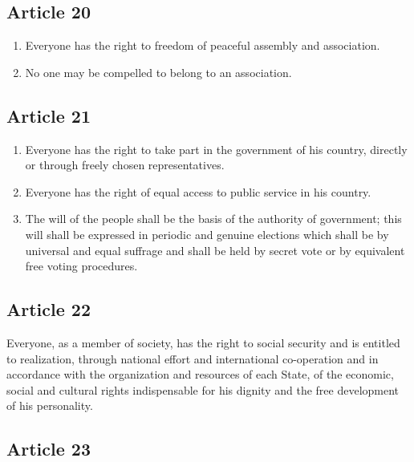 \documentclass[
  ngerman,
  american,
  titlepage,
  openright,
  DIV=calc,
  toc=listof,
  listof=nochaptergap]{scrbook}
\begin{document}
\subsection{Article 20}\label{article-20-4}

\begin{enumerate}
\def\labelenumi{\arabic{enumi}.}
\item
  Everyone has the right to freedom of peaceful assembly and
  association.
\item
  No one may be compelled to belong to an association.
\end{enumerate}

\subsection{Article 21}\label{article-21-4}

\begin{enumerate}
\def\labelenumi{\arabic{enumi}.}
\item
  Everyone has the right to take part in the government of his country,
  directly or through freely chosen representatives.
\item
  Everyone has the right of equal access to public service in his
  country.
\item
  The will of the people shall be the basis of the authority of
  government; this will shall be expressed in periodic and genuine
  elections which shall be by universal and equal suffrage and shall be
  held by secret vote or by equivalent free voting procedures.
\end{enumerate}

\subsection{Article 22}\label{article-22-4}

Everyone, as a member of society, has the right to social security and
is entitled to realization, through national effort and international
co-operation and in accordance with the organization and resources of
each State, of the economic, social and cultural rights indispensable
for his dignity and the free development of his personality.

\subsection{Article 23}\label{article-23-4}
\end{document}
